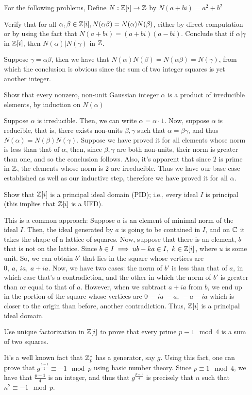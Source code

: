 For the following problems, Define \(N: \mathbb Z[i] \to \mathbb Z \) by \(N(a+bi) = a^2+b^2\)
\begin{problem}
Verify that for all \(\alpha, \beta \in \mathbb Z[i], N(\alpha\beta)=N(\alpha)N(\beta) \), either by direct computation or by using the fact that \(N(a+bi)=(a+bi)(a-bi) \). Conclude that if \(\alpha | \gamma \) in \( \mathbb Z[i]\), then \(N(\alpha) | N(\gamma) \) in \(\mathbb Z\).
\end{problem}
Suppose \( \gamma = \alpha \beta \), then we have that \(N(\alpha)N(\beta) = N(\alpha\beta) = N(\gamma) \), from which the conclusion is obvious since the sum of two integer squares is yet another integer.
\begin{problem}
Show that every nonzero, non-unit Gaussian integer \( \alpha \) is a product of irreducible elements, by induction on \(N(\alpha)\)
\end{problem}
Suppose \(\alpha\) is irreducible. Then, we can write \(\alpha = \alpha \cdot 1 \). Now, suppose \( \alpha \) is reducible, that is, there exists non-units \(\beta, \gamma\) such that \( \alpha = \beta \gamma \), and thus \( N(\alpha) = N(\beta) N(\gamma) \). Suppose we have proved it for all elements whose norm is less than that of \( \alpha \), then, since \(\beta, \gamma\) are both non-units, their norm is greater than one, and so the conclusion follows. Also, it's apparent that since \(2\) is prime in \(\mathbb Z\), the elements whose norm is \(2\) are irreducible. Thus we have our base case established as well as our inductive step, therefore we have proved it for all \(\alpha\).
\begin{problem}
Show that \(\mathbb Z[i]\) is a principal ideal domain (PID); i.e., every ideal \(I\) is principal (this implies that \(\mathbb Z[i]\) is a UFD).
\end{problem}
This is a common approach: Suppose \(a\) is an element of minimal norm of the ideal \(I\). Then, the ideal generated by \(a\) is going to be contained in \(I\), and on \(\mathbb C\) it takes the shape of a lattice of squares. Now, suppose that there is an element, \(b\) that is not on the lattice. Since \(b \in I \implies ub-ka \in I, \ k \in \mathbb Z[i] \), where \(u\) is some unit. So, we can obtain \(b'\) that lies in the square whose vertices are \(0, \ a, \ ia, \ a+ia \). Now, we have two cases: the norm of \(b'\) is less than that of \(a\), in which case that's a contradiction, and the other in which the norm of \(b'\) is greater than or equal to that of \(a\). However, when we subtract \(a+ia\) from \(b\), we end up in the portion of the square whose vertices are \(0 \ -ia \ -a, \ -a-ia \) which is closer to the origin than before, another contradiction. Thus, \(\mathbb Z[i]\) is a principal ideal domain.
\begin{problem}
Use unique factorization in \(\mathbb Z[i]\) to prove that every prime \(p \equiv 1 \mod 4\) is a sum of two squares.
\end{problem}
It's a well known fact that \(\mathbb Z_p^*\) has a generator, say \(g\). Using this fact, one can prove that \(g^{\frac{p-1}{2}} \equiv -1 \mod p\) using basic number theory. Since \(p \equiv 1 \mod 4\), we have that \( \frac{p-1}{4} \) is an integer, and thus that \(g^{\frac{p-1}{4}}\) is precisely that \(n\) such that \(n^2 \equiv -1 \mod p\).

